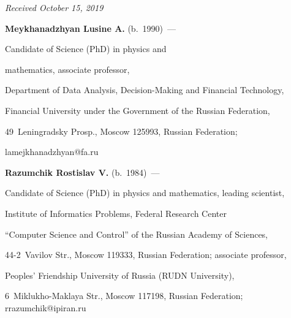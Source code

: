 \hfill{\small\textit{Received October 15, 2019}}









\Contr



\noindent

\textbf{Meykhanadzhyan Lusine A.} (b.\ 1990)~---

Candidate of Science (PhD) in physics and

mathematics, associate professor,

Department of Data Analysis, Decision-Making and Financial Technology,

Financial University under the Government of the Russian Federation,

49~Leningradsky Prosp., Moscow 125993, Russian Federation;

\mbox{lamejkhanadzhyan@fa.ru}



\vspace*{3pt}



\noindent

\textbf{Razumchik Rostislav V.} (b.\ 1984)~---

Candidate of Science (PhD) in physics and mathematics, leading scientist,

Institute of Informatics Problems, Federal Research Center 

``Computer Science and Control'' of the Russian Academy of Sciences, 

44-2~Vavilov Str., Moscow 119333, Russian Federation; associate professor,

 Peoples' Friendship University of Russia (RUDN University), 

 6~Miklukho-Maklaya Str., Moscow 117198, Russian Federation; \mbox{rrazumchik@ipiran.ru}







\label{end\stat}



\renewcommand{\bibname}{\protect\rm Литература}  

